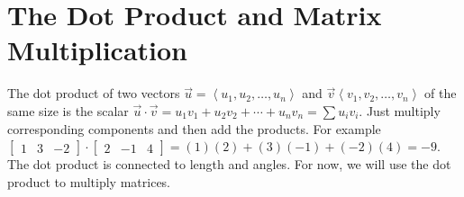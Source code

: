 \documentclass[10pt]{article}
\begin{document}
\section{The Dot Product and Matrix Multiplication}

The dot product of two vectors $\vec u = \left<u_1,u_2,\ldots,u_n\right>$ and $\vec v \left<v_1,v_2,\ldots,v_n\right>$ of the same size is the scalar $\vec u\cdot \vec v = u_1v_1+u_2v_2+\cdots+u_nv_n = \sum u_iv_i$. Just multiply corresponding components and then add the products. For example $\begin{bmatrix}1&3&-2\end{bmatrix}\cdot \begin{bmatrix}2&-1&4\end{bmatrix} = (1)(2)+(3)(-1)+(-2)(4)=-9$. The dot product is connected to length and angles. For now, we will use the dot product to multiply matrices.
\end{document}

